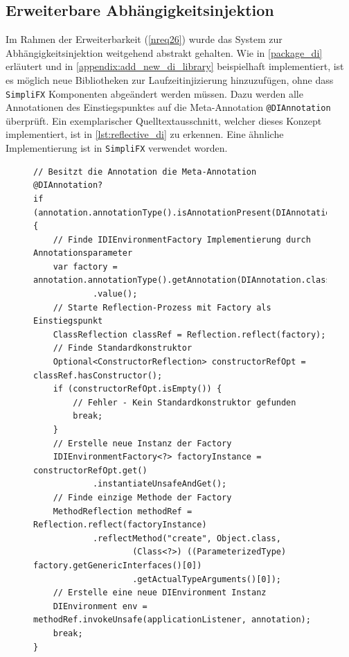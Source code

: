 \subsection{Erweiterbare Abhängigkeitsinjektion}
Im Rahmen der Erweiterbarkeit (\autoref{nreq26}) wurde das System zur Abhängigkeitsinjektion weitgehend abstrakt gehalten. Wie in \autoref{package_di} erläutert und in \autoref{appendix:add_new_di_library} beispielhaft implementiert, ist es möglich neue Bibliotheken zur Laufzeitinjizierung hinzuzufügen, ohne dass \texttt{SimpliFX} Komponenten abgeändert werden müssen. Dazu werden alle Annotationen des Einstiegspunktes auf die Meta-Annotation \texttt{@DIAnnotation} überprüft. Ein exemplarischer Quelltextausschnitt, welcher dieses Konzept implementiert, ist in \autoref{lst:reflective_di} zu erkennen. Eine ähnliche Implementierung ist in \texttt{SimpliFX} verwendet worden.
\begin{figure}[H]
	\centering
	\begin{lstlisting}[caption=Implementierung -- Abhängigkeitsinjektion, captionpos=b, label=lst:reflective_di, basicstyle={\scriptsize\ttfamily}]
// Besitzt die Annotation die Meta-Annotation @DIAnnotation?
if (annotation.annotationType().isAnnotationPresent(DIAnnotation.class)) {
	// Finde IDIEnvironmentFactory Implementierung durch Annotationsparameter
	var factory = annotation.annotationType().getAnnotation(DIAnnotation.class)
			.value();
	// Starte Reflection-Prozess mit Factory als Einstiegspunkt
	ClassReflection classRef = Reflection.reflect(factory);
	// Finde Standardkonstruktor
	Optional<ConstructorReflection> constructorRefOpt = classRef.hasConstructor();
	if (constructorRefOpt.isEmpty()) {
		// Fehler - Kein Standardkonstruktor gefunden
		break;
	}
	// Erstelle neue Instanz der Factory
	IDIEnvironmentFactory<?> factoryInstance = constructorRefOpt.get()
			.instantiateUnsafeAndGet();
	// Finde einzige Methode der Factory
	MethodReflection methodRef = Reflection.reflect(factoryInstance)
			.reflectMethod("create", Object.class, 
					(Class<?>) ((ParameterizedType) factory.getGenericInterfaces()[0])
					.getActualTypeArguments()[0]);
	// Erstelle eine neue DIEnvironment Instanz
	DIEnvironment env = methodRef.invokeUnsafe(applicationListener, annotation);
	break;
}
	\end{lstlisting}
\end{figure}